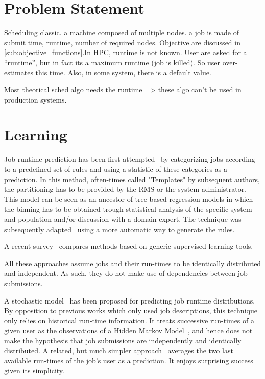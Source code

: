\documentclass{llncs}
\begin{document}
\section{Problem Statement}
\label{sec:problem_statement}

Scheduling classic.
a machine composed of multiple nodes.
a job is made of submit time, runtime, number of required nodes.
Objective are discussed in \ref{sub:objective_functions}.In HPC, runtime is not known.
User are asked for a ``runtime'', but in fact its a maximum runtime (job is killed).
So user over-estimates this time.
Also, in some system, there is a default value.

Most theorical sched algo needs the runtime => these algo can't be used in production systems.


\section{Learning}
\label{sec:learning}

Job runtime prediction has been first attempted~\cite{gibbons} by categorizing jobs according to a predefined set of rules and using a statistic of these categories as a prediction. In this method, often-times called "Templates" by subsequent authors, the partitioning has to be provided by the RMS or the system administrator. This model can be seen as an ancestor of tree-based regression models in which the binning has to be obtained trough statistical analysis of the specific system and population and/or discussion with a domain expert. The technique was subsequently adapted~\cite{gibbons-GA} using a more automatic way to generate the rules.

A recent survey~\cite{ML-predictruntime-survey} compares methods based on generic supervised learning tools.

All these approaches assume jobs and their run-times to be identically distributed and independent. As such, they do not make use of dependencies between job submissions.

A stochastic model~\cite{hmm} has been proposed for predicting job runtime distributions. By opposition to previous works which only used job descriptions, this technique only relies on historical run-time information. It treats successive run-times of a given user as the observations of a Hidden Markov Model~\cite{rabiner}, and hence does not make the hypothesis that job submissions are independently and identically distributed.
A related, but much simpler approach~\cite{tsafir} averages the two last available run-times of the job's user as a prediction. It enjoys surprising success given its simplicity.
\end{document}
